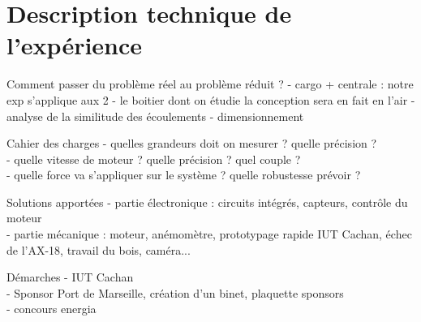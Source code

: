 \documentclass[a4paper,twoside,12pt]{article}
\newcounter{partie}
\newcounter{sous-partie}
\newenvironment{partie}[1]
{
\section{#1}
}
{

}
\newenvironment{sous-partie}[1]
{
\subsection{#1}
}
{

}
\begin{document}
\begin{partie}{Description technique de l'expérience}

\begin{sous-partie}{Comment passer du problème réel au problème réduit ?}
- cargo + centrale : notre exp s'applique aux 2
\newline
- le boitier dont on étudie la conception sera en fait en l'air
\newline
- analyse de la similitude des écoulements
\newline
- dimensionnement

\end{sous-partie}

\begin{sous-partie}{Cahier des charges}
- quelles grandeurs doit on mesurer ? %
quelle précision ?
\\
- quelle vitesse de moteur ? %
quelle précision ? %
quel couple ?
\\
- quelle force va s'appliquer sur le système ? %
quelle robustesse prévoir ?
\end{sous-partie}

\begin{sous-partie}{Solutions apportées}
- partie électronique : circuits intégrés, capteurs, contrôle du moteur
\\
- partie mécanique :  moteur, anémomètre, prototypage rapide IUT Cachan, échec de l'AX-18, travail du bois, caméra...
\end{sous-partie}

\begin{sous-partie}{Démarches}
- IUT Cachan
\\
- Sponsor Port de Marseille, création d'un binet, plaquette sponsors
\\
- concours energia
\end{sous-partie}




\end{partie}

\newpage
\end{document}
